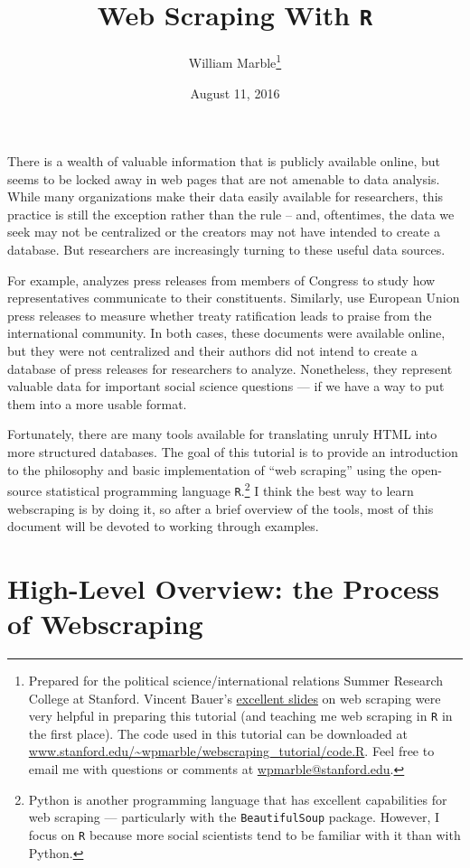 \documentclass{article}\usepackage[]{graphicx}\usepackage[]{color}
\title{Web Scraping With \texttt{R}}
\author{William Marble\thanks{Prepared for the political science/international relations Summer Research College at Stanford. Vincent Bauer's \href{http://stanford.edu/~vbauer/VAMScrapingSlides.html}{excellent slides} on web scraping were very helpful in preparing this tutorial (and teaching me web scraping in \texttt{R} in the first place). The code used in this tutorial can be downloaded at \href{www.stanford.edu/~wpmarble/webscraping_tutorial/code.R}{{www.stanford.edu/\textasciitilde wpmarble/webscraping\_tutorial/code.R}}. Feel free to email me with questions or comments at \href{mailto:wpmarble@stanford.edu}{wpmarble@stanford.edu}.}}
\date{August 11, 2016}
\begin{document}
\maketitle

There is a wealth of valuable information that is publicly available online, but seems to be locked away in web pages that are not amenable to data analysis. While many organizations make their data easily available for researchers, this practice is still the exception rather than the rule -- and, oftentimes, the data we seek may not be centralized or the creators may not have intended to create a database. But researchers are increasingly turning to these useful data sources.

For example,  analyzes press releases from members of Congress to study how representatives communicate to their constituents. Similarly,  use European Union press releases to measure whether treaty ratification leads to praise from the international community. In both cases, these documents were available online, but they were not centralized and their authors did not intend to create a database of press releases for researchers to analyze. Nonetheless, they represent valuable data for important social science questions --- if we have a way to put them into a more usable format.

Fortunately, there are many tools available for translating unruly HTML into more structured databases. The goal of this tutorial is to provide an introduction to the philosophy and basic implementation of ``web scraping'' using the open-source statistical programming language \texttt{R}.\footnote{Python is another programming language that has excellent capabilities for web scraping --- particularly with the \texttt{BeautifulSoup} package. However, I focus on \texttt{R} because more social scientists tend to be familiar with it than with Python.} I think the best way to learn webscraping is by doing it, so after a brief overview of the tools, most of this document will be devoted to working through examples.

\section{High-Level Overview: the Process of Webscraping}
\end{document}
